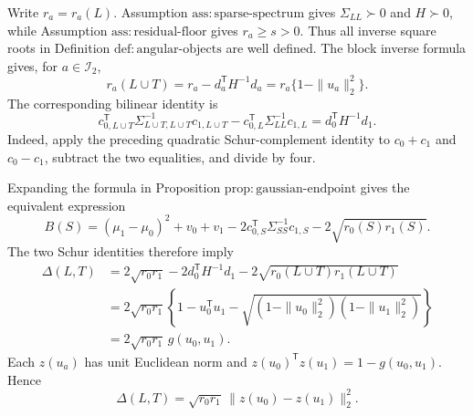 Write \(r_a=r_a(L)\). Assumption \(\mathrm{ass{:}sparse\text{-}spectrum}\) gives \(\Sigma_{LL}\succ0\) and \(H\succ0\), while Assumption \(\mathrm{ass{:}residual\text{-}floor}\) gives \(r_a\ge s>0\). Thus all inverse square roots in Definition \(\mathrm{def{:}angular\text{-}objects}\) are well defined. The block inverse formula gives, for \(a\in\mathcal I_2\),
\[
 r_a(L\cup T)=r_a-d_a^{\mathsf T}H^{-1}d_a
 =r_a\{1-\|u_a\|_2^2\}.
\]
The corresponding bilinear identity is
\[
 c_{0,L\cup T}^{\mathsf T}\Sigma_{L\cup T,L\cup T}^{-1}c_{1,L\cup T}
 -c_{0,L}^{\mathsf T}\Sigma_{LL}^{-1}c_{1,L}
 =d_0^{\mathsf T}H^{-1}d_1.
\]
Indeed, apply the preceding quadratic Schur-complement identity to \(c_0+c_1\) and \(c_0-c_1\), subtract the two equalities, and divide by four.

Expanding the formula in Proposition \(\mathrm{prop{:}gaussian\text{-}endpoint}\) gives the equivalent expression
\[
 B(S)=(\mu_1-\mu_0)^2+v_0+v_1
 -2c_{0,S}^{\mathsf T}\Sigma_{SS}^{-1}c_{1,S}
 -2\sqrt{r_0(S)r_1(S)}.
\]
The two Schur identities therefore imply
\[
\begin{aligned}
 \Delta(L,T)
 &=2\sqrt{r_0r_1}-2d_0^{\mathsf T}H^{-1}d_1
   -2\sqrt{r_0(L\cup T)r_1(L\cup T)}\\
 &=2\sqrt{r_0r_1}\left\{1-u_0^{\mathsf T}u_1
 -\sqrt{(1-\|u_0\|_2^2)(1-\|u_1\|_2^2)}\right\}\\
 &=2\sqrt{r_0r_1}\,g(u_0,u_1).
\end{aligned}
\]
Each \(z(u_a)\) has unit Euclidean norm and \(z(u_0)^{\mathsf T}z(u_1)=1-g(u_0,u_1)\). Hence
\[
 \Delta(L,T)=\sqrt{r_0r_1}\,\|z(u_0)-z(u_1)\|_2^2.
\]

